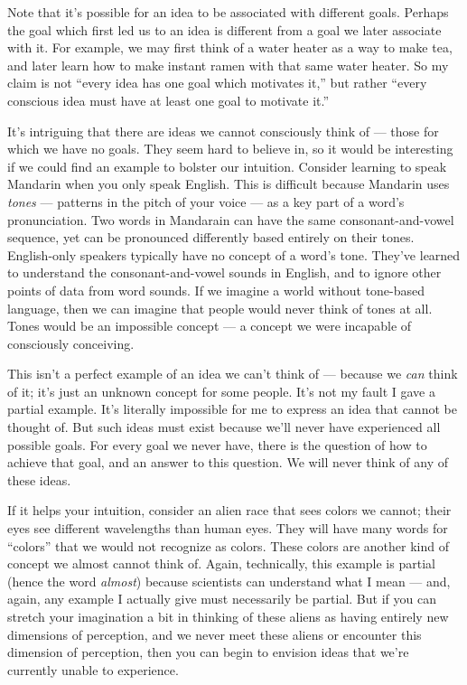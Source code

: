 \documentclass[9pt, twoside]{book}
\theoremstyle{argtstyle}
\begin{document}
Note that it's possible for an idea to be associated with different goals.
Perhaps the goal which first led us to an idea is
different from a goal we later associate with it. For example, we may first
think of a water heater as a way to make tea, and later learn how to make
instant ramen with that same water heater.
So my claim is not ``every idea has one goal which motivates it,'' but rather
``every conscious idea must have at least one goal to motivate it.''

It's intriguing that there are ideas we cannot consciously think of ---
those for
which we have no goals. They seem hard to believe in, so it would be
interesting if we could find an example to bolster our intuition.
Consider learning to speak Mandarin when you only speak English.
This is difficult because Mandarin uses {\em tones} --- patterns in the pitch of
your voice --- as a key part of a word's pronunciation.
Two words in Mandarain can have
the same consonant-and-vowel sequence, yet can be
pronounced differently based entirely on their tones.
English-only speakers typically have no concept of a word's tone.
They've learned to understand the consonant-and-vowel sounds in English, and to
ignore other points of data from word sounds. If we imagine a world without
tone-based language, then we can imagine that people would never think of
tones at all. Tones would be an impossible concept --- a concept we were
incapable of consciously conceiving.

This isn't a perfect example of an idea we can't think of --- because we {\em
can} think of it; it's just an unknown concept for some people.
It's not my fault I
gave a partial example.
It's literally impossible for me to express an idea that
cannot be thought of.
But such ideas must exist because we'll never
have experienced all possible goals.
For every goal we never have,
there is the question of how to achieve that goal, and an answer to this
question. We will never think of any of these ideas.

If it helps your intuition, consider an alien race that sees colors we cannot;
their eyes see different wavelengths than human eyes.
They will have many words for ``colors''
that we would not recognize as colors. These colors are another kind of concept
we almost cannot think of.
Again, technically, this example is
partial (hence the word {\em almost})
because scientists can understand what I mean --- and, again, any
example I actually give must necessarily be partial. But if you can stretch your
imagination a bit in thinking of these aliens as having entirely new dimensions
of perception, and we never meet these aliens or encounter this dimension of
perception, then you can begin to envision ideas that we're currently
unable to experience.
\end{document}
